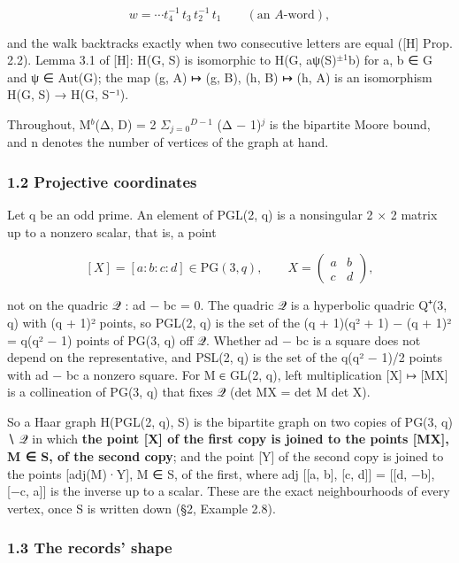 \documentclass[
  10pt,
]{article}
\begin{document}
\[w = \cdots t_4^{-1}\, t_3\, t_2^{-1}\, t_1 \qquad (\text{an } A\text{-word}),\]

and the walk backtracks exactly when two consecutive letters are equal
({[}H{]} Prop. 2.2). Lemma 3.1 of {[}H{]}: H(G, S) is isomorphic to H(G,
aψ(S)\(^{±1}\)b) for a, b ∈ G and ψ ∈ Aut(G); the map (g, A) ↦ (g, B),
(h, B) ↦ (h, A) is an isomorphism H(G, S) → H(G, S⁻¹).

Throughout, M\(^{b}\)(Δ, D) = 2 \(Σ_{j=0}\)\(^{D−1}\) (Δ − 1)\(^{j}\) is
the bipartite Moore bound, and n denotes the number of vertices of the
graph at hand.

\hypertarget{projective-coordinates}{%
\subsubsection{1.2 Projective
coordinates}\label{projective-coordinates}}

Let q be an odd prime. An element of PGL(2, q) is a nonsingular 2 × 2
matrix up to a nonzero scalar, that is, a point

\[[X] = [a : b : c : d] \in \mathrm{PG}(3, q), \qquad X = \begin{pmatrix} a & b \\ c & d\end{pmatrix},\]

not on the quadric 𝒬 : ad − bc = 0. The quadric 𝒬 is a hyperbolic
quadric Q⁺(3, q) with (q + 1)² points, so PGL(2, q) is the set of the (q
+ 1)(q² + 1) − (q + 1)² = q(q² − 1) points of PG(3, q) off 𝒬. Whether ad
− bc is a square does not depend on the representative, and PSL(2, q) is
the set of the q(q² − 1)/2 points with ad − bc a nonzero square. For M ∈
GL(2, q), left multiplication {[}X{]} ↦ {[}MX{]} is a collineation of
PG(3, q) that fixes 𝒬 (det MX = det M det X).

So a Haar graph H(PGL(2, q), S) is the bipartite graph on two copies of
PG(3, q) ∖ 𝒬 in which \textbf{the point {[}X{]} of the first copy is
joined to the points {[}MX{]}, M ∈ S, of the second copy}; and the point
{[}Y{]} of the second copy is joined to the points {[}adj(M)·Y{]}, M ∈
S, of the first, where adj {[}{[}a, b{]}, {[}c, d{]}{]} = {[}{[}d,
−b{]}, {[}−c, a{]}{]} is the inverse up to a scalar. These are the exact
neighbourhoods of every vertex, once S is written down (§2, Example
2.8).

\hypertarget{the-records-shape}{%
\subsubsection{1.3 The records' shape}\label{the-records-shape}}
\end{document}

